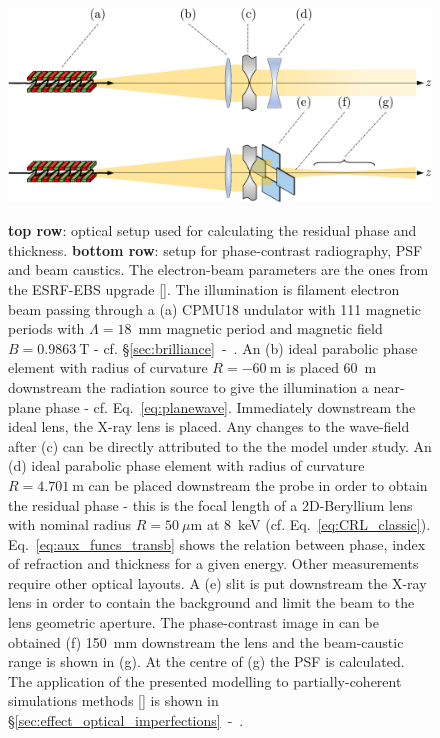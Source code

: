 \begin{refsection}
\begin{figure}[!htb]
    \centering
    {\includegraphics[width=.7\linewidth]{figures/ch04/simulations.pdf}}
    \caption[Optical layout used for modelling imperfections in CRL]{\textbf{top row}: optical setup used for calculating the residual phase and thickness. \textbf{bottom row}: setup for phase-contrast radiography, PSF and beam caustics. The electron-beam parameters are the ones from the ESRF-EBS upgrade [\cite{orangebook}]. The illumination is filament electron beam passing through a (a) CPMU18 undulator with 111 magnetic periods with $\Lambda=18$~mm magnetic period and magnetic field $B=0.9863~$T - cf. \S\ref{sec:brilliance}~-~\textit{}. An (b) ideal parabolic phase element with radius of curvature $R=-60~$m is placed 60~m downstream the radiation source to give the illumination a near-plane phase - cf. Eq.~\ref{eq:planewave}. Immediately downstream the ideal lens, the X-ray lens is placed. Any changes to the wave-field after (c) can be directly attributed to the the model under study. An (d) ideal parabolic phase element with radius of curvature $R=4.701~$m can be placed downstream the probe in order to obtain the residual phase - this is the focal length of a 2D-Beryllium lens with nominal radius $R=50~\mu\text{m}$ at 8~keV (cf. Eq.~\ref{eq:CRL_classic}). Eq.~\ref{eq:aux_funcs_transb} shows the relation between phase, index of refraction and thickness for a given energy. Other measurements require other optical layouts. A (e) slit is put downstream the X-ray lens in order to contain the background and limit the beam to the lens geometric aperture. The phase-contrast image in can be obtained (f) 150~mm downstream the lens and the beam-caustic range is shown in (g). At the centre of (g) the PSF is calculated. The application of the presented modelling to partially-coherent simulations methods [\cite{Chubar2011}] is shown in \S\ref{sec:effect_optical_imperfections}~-~\textit{}.}
    \label{fig:optical_layouts}
\end{figure}

\end{refsection}
